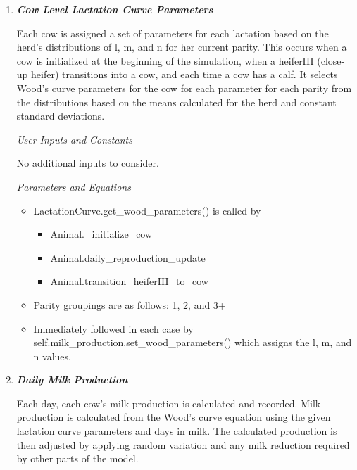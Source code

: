 \begin{refsection}
\begin{enumerate}
        \item \textbf{\textit{Cow Level Lactation Curve Parameters}} 
        \vspace{-0.1cm}
        
        Each cow is assigned a set of parameters for each lactation based on the herd’s distributions of l, m, and n for her current parity. This occurs when a cow is initialized at the beginning of the simulation, when a heiferIII (close-up heifer) transitions into a cow, and each time a cow has a calf. It selects Wood’s curve parameters for the cow for each parameter for each parity from the distributions based on the means calculated for the herd and constant standard deviations.
         \vspace{0.1cm}

         \textit{User Inputs and Constants}
         \vspace{0.1cm}

         No additional inputs to consider. 
         
         \textit{Parameters and Equations}
         \vspace{0.1cm}

        \begin{itemize}
            \item LactationCurve.get\_wood\_parameters() is called by
            \begin{itemize}
                \item Animal.\_initialize\_cow
                \item Animal.daily\_reproduction\_update
                \item Animal.transition\_heiferIII\_to\_cow
            \end{itemize}
            \item Parity groupings are as follows: 1, 2, and 3+ 
            \item Immediately followed in each case by self.milk\_production.set\_wood\_parameters() which assigns the l, m, and n values.
        \end{itemize}
            \vspace{0.25cm}

        \item \textbf{\textit{Daily Milk Production}} 
        \vspace{0.1cm}
        
        Each day, each cow’s milk production is calculated and recorded. Milk production is calculated from the Wood’s curve equation using the given lactation curve parameters and days in milk. The calculated production is then adjusted by applying random variation and any milk reduction required by other parts of the model. 
         \vspace{0.1cm}


\end{enumerate}
\end{refsection}

